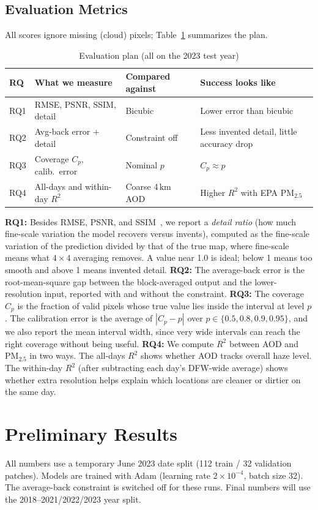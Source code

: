 \documentclass[conference]{IEEEtran}
\begin{document}
\subsection{Evaluation Metrics}
All scores ignore missing (cloud) pixels; Table~\ref{tab:eval} summarizes the plan.
\begin{table}[htbp]
\caption{Evaluation plan (all on the 2023 test year)}
\label{tab:eval}
\centering
\footnotesize
\setlength{\tabcolsep}{2pt}
\begin{tabularx}{\columnwidth}{@{}l l l >{\raggedright\arraybackslash}X@{}}
\toprule
\textbf{RQ} & \textbf{What we measure} & \textbf{Compared against} & \textbf{Success looks like} \\
\midrule
RQ1 & RMSE, PSNR, SSIM, detail & Bicubic & Lower error than bicubic \\
RQ2 & Avg-back error + detail & Constraint off & Less invented detail, little accuracy drop \\
RQ3 & Coverage \(C_p\), calib.\ error & Nominal \(p\) & \(C_p\approx p\) \\
RQ4 & All-days and within-day \(R^2\) & Coarse 4\,km AOD & Higher \(R^2\) with EPA PM$_{2.5}$ \\
\bottomrule
\end{tabularx}
\end{table}
\textbf{RQ1:} Besides RMSE, PSNR, and SSIM~\cite{wang2004ssim}, we report a \emph{detail ratio} (how much fine-scale variation the model recovers versus invents), computed as the fine-scale variation of the prediction divided by that of the true map, where fine-scale means what \(4\times4\) averaging removes. A value near 1.0 is ideal; below 1 means too smooth and above 1 means invented detail.
\textbf{RQ2:} The average-back error is the root-mean-square gap between the block-averaged output and the lower-resolution input, reported with and without the constraint.
\textbf{RQ3:} The coverage \(C_p\) is the fraction of valid pixels whose true value lies inside the interval at level \(p\). The calibration error is the average of \(|C_p-p|\) over \(p\in\{0.5,0.8,0.9,0.95\}\), and we also report the mean interval width, since very wide intervals can reach the right coverage without being useful.
\textbf{RQ4:} We compute \(R^2\) between AOD and PM$_{2.5}$ in two ways. The all-days \(R^2\) shows whether AOD tracks overall haze level. The within-day \(R^2\) (after subtracting each day's DFW-wide average) shows whether extra resolution helps explain which locations are cleaner or dirtier on the same day.
\section{Preliminary Results}
All numbers use a temporary June 2023 date split (112 train / 32 validation patches). Models are trained with Adam (learning rate \(2\times10^{-4}\), batch size 32). The average-back constraint is switched off for these runs. Final numbers will use the 2018--2021/2022/2023 year split.
\end{document}
